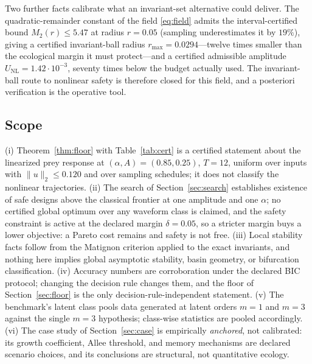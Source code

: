 \documentclass[mathematics,article,accept,pdftex,moreauthors]{Definitions/mdpi}
\begin{document}
Two further facts calibrate what an invariant-set alternative could deliver. The quadratic-remainder constant of the field \eqref{eq:field} admits the interval-certified bound $M_{2}(r)\le5.47$ at radius $r=0.05$ (sampling underestimates it by $19\%$), giving a certified invariant-ball radius $r_{\max}=0.0294$---twelve times smaller than the ecological margin it must protect---and a certified admissible amplitude $U_{\mathrm{NL}}=1.42\cdot10^{-3}$, seventy times below the budget actually used. The invariant-ball route to nonlinear safety is therefore closed for this field, and a posteriori verification is the operative tool.

\subsection{Scope}

\begin{Proposition}
\label{prop:scope}
(i) Theorem~\ref{thm:floor} with Table~\ref{tab:cert} is a certified statement about the linearized prey response at $(\alpha,A)=(0.85,0.25)$, $T=12$, uniform over inputs with $\|u\|_{2}\le0.120$ and over sampling schedules; it does not classify the nonlinear trajectories. (ii) The search of Section~\ref{sec:search} establishes existence of safe designs above the classical frontier at one amplitude and one $\alpha$; no certified global optimum over any waveform class is claimed, and the safety constraint is active at the declared margin $\delta=0.05$, so a stricter margin buys a lower objective: a Pareto cost remains and safety is not free. (iii) Local stability facts follow from the Matignon criterion applied to the exact invariants, and nothing here implies global asymptotic stability, basin geometry, or bifurcation classification. (iv) Accuracy numbers are corroboration under the declared BIC protocol; changing the decision rule changes them, and the floor of Section~\ref{sec:floor} is the only decision-rule-independent statement. (v) The benchmark's latent class pools data generated at latent orders $m=1$ and $m=3$ against the single $m=3$ hypothesis; class-wise statistics are pooled accordingly. (vi) The case study of Section~\ref{sec:case} is empirically \emph{anchored}, not calibrated: its growth coefficient, Allee threshold, and memory mechanisms are declared scenario choices, and its conclusions are structural, not quantitative ecology.
\end{Proposition}

\end{document}
